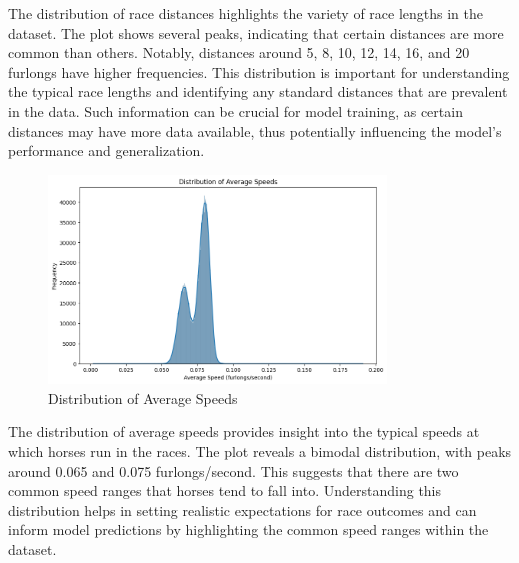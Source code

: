 \documentclass{article}
\begin{document}
The distribution of race distances highlights the variety of race lengths in the dataset. The plot shows several peaks, indicating that certain distances are more common than others. Notably, distances around 5, 8, 10, 12, 14, 16, and 20 furlongs have higher frequencies. This distribution is important for understanding the typical race lengths and identifying any standard distances that are prevalent in the data. Such information can be crucial for model training, as certain distances may have more data available, thus potentially influencing the model's performance and generalization.

\begin{figure}[H]
    \centering
    \includegraphics[width=0.8\textwidth]{images/distribution_avg_speeds.png} %
    \caption{Distribution of Average Speeds}
    \label{fig:distribution_average_speeds}
\end{figure}

The distribution of average speeds provides insight into the typical speeds at which horses run in the races. The plot reveals a bimodal distribution, with peaks around 0.065 and 0.075 furlongs/second. This suggests that there are two common speed ranges that horses tend to fall into. Understanding this distribution helps in setting realistic expectations for race outcomes and can inform model predictions by highlighting the common speed ranges within the dataset.
\end{document}
